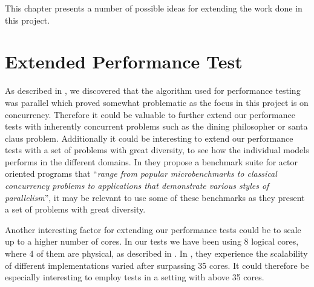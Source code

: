 \makeatletter {}\makeatother
{}
This chapter presents a number of possible ideas for extending the work done in this project.

\section{Extended Performance Test}
\label{sec:extended_performance_test}
As described in , we discovered that the algorithm used for performance testing was parallel which proved somewhat problematic as the focus in this project is on concurrency. Therefore it could be valuable to further extend our performance tests with inherently concurrent problems such as the dining philosopher or santa claus problem. Additionally it could be interesting to extend our performance tests with a set of problems with great diversity, to see how the individual models performs in the different domains. In \cite{imam2014savina} they propose a benchmark suite for actor oriented programs that ``\textit{range from popular microbenchmarks to classical concurrency problems to applications that demonstrate various styles of parallelism}'', it may be relevant to use some of these benchmarks as they present a set of problems with great diversity.

Another interesting factor for extending our performance tests could be to scale up to a higher number of cores. In our tests we have been using 8 logical cores, where 4 of them are physical, as described in . In \cite{harris2003language}, they experience the scalability of different implementations varied after surpassing 35 cores. It could therefore be especially interesting to employ tests in a setting with above 35 cores.



